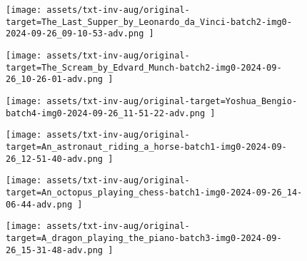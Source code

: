 \begin{figure*}[t]
    \vspace{1mm}
    \begin{minipage}[t]{.025\textwidth}
         \vspace{11mm}
    \end{minipage}%
    \begin{minipage}[t]{.98\textwidth}
        \vspace{0pt}
            \begin{subfigure}[t]{0.16\textwidth}
                    \texttt{[image:  assets/txt-inv-aug/original-target=The\_Last\_Supper\_by\_Leonardo\_da\_Vinci-batch2-img0-2024-09-26\_09-10-53-adv.png ]}
            \end{subfigure}%
                \hspace{0.5mm}%
            \begin{subfigure}[t]{0.16\textwidth}
                    \texttt{[image:  assets/txt-inv-aug/original-target=The\_Scream\_by\_Edvard\_Munch-batch2-img0-2024-09-26\_10-26-01-adv.png ]}
            \end{subfigure}%
                \hspace{0.5mm}%
            \begin{subfigure}[t]{0.16\textwidth}
                    \texttt{[image:  assets/txt-inv-aug/original-target=Yoshua\_Bengio-batch4-img0-2024-09-26\_11-51-22-adv.png ]}
            \end{subfigure}%
                \hspace{0.5mm}%
            \begin{subfigure}[t]{0.16\textwidth}
                    \texttt{[image:  assets/txt-inv-aug/original-target=An\_astronaut\_riding\_a\_horse-batch1-img0-2024-09-26\_12-51-40-adv.png ]}
            \end{subfigure}%
                \hspace{0.5mm}%
            \begin{subfigure}[t]{0.16\textwidth}
                    \texttt{[image:  assets/txt-inv-aug/original-target=An\_octopus\_playing\_chess-batch1-img0-2024-09-26\_14-06-44-adv.png ]}
            \end{subfigure}%
                \hspace{0.5mm}%
            \begin{subfigure}[t]{0.16\textwidth}
                    \texttt{[image:  assets/txt-inv-aug/original-target=A\_dragon\_playing\_the\_piano-batch3-img0-2024-09-26\_15-31-48-adv.png ]}
            \end{subfigure}%
    \end{minipage}


\end{figure*}
